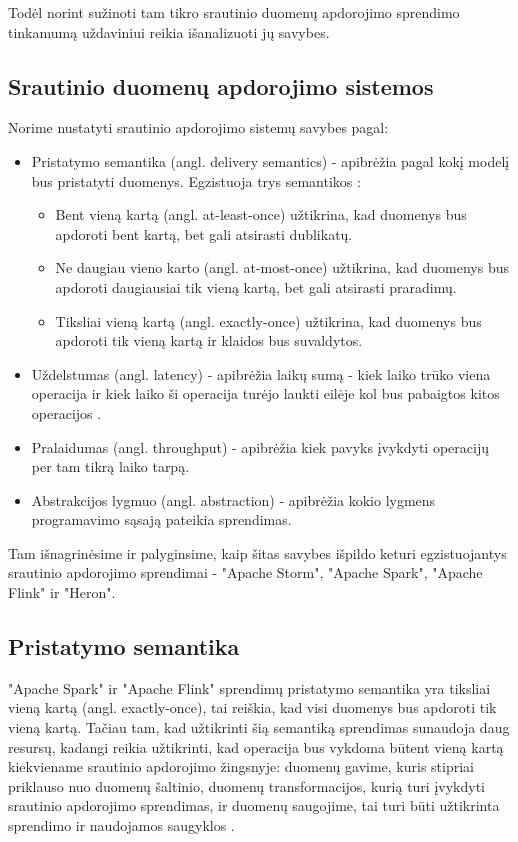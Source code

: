 \documentclass{VUMIFPSbakalaurinis}
\begin{document}
Todėl norint sužinoti tam tikro srautinio duomenų apdorojimo sprendimo tinkamumą uždaviniui reikia išanalizuoti jų savybes.   
\subsection{Srautinio duomenų apdorojimo sistemos}

Norime nustatyti srautinio apdorojimo sistemų savybes pagal:
\begin{itemize}
    \item Pristatymo semantika (angl. delivery semantics) - apibrėžia pagal kokį modelį bus pristatyti duomenys. Egzistuoja trys semantikos \cite{ensar20}: 
    \begin{itemize}
        \item Bent vieną kartą (angl. at-least-once) užtikrina, kad duomenys bus apdoroti bent kartą, bet gali atsirasti dublikatų. 
        \item Ne daugiau vieno karto (angl. at-most-once) užtikrina, kad duomenys bus apdoroti daugiausiai tik vieną kartą, bet gali atsirasti praradimų. 
        \item Tiksliai vieną kartą (angl. exactly-once) užtikrina, kad duomenys bus apdoroti tik vieną kartą ir klaidos bus suvaldytos.
    \end{itemize}
    \item Uždelstumas (angl. latency) - apibrėžia laikų sumą - kiek laiko trūko viena operacija ir kiek laiko ši operacija turėjo laukti eilėje kol bus pabaigtos kitos operacijos \cite{karimov2018benchmarking}.
    \item Pralaidumas (angl. throughput) - apibrėžia kiek pavyks įvykdyti operacijų per tam tikrą laiko tarpą.
    \item Abstrakcijos lygmuo (angl. abstraction) - apibrėžia kokio lygmens programavimo sąsają pateikia sprendimas.
\end{itemize}
Tam išnagrinėsime ir palyginsime, kaip šitas savybes išpildo keturi egzistuojantys srautinio apdorojimo sprendimai - "Apache Storm", "Apache Spark", "Apache Flink" ir "Heron".

\subsection{Pristatymo semantika}
"Apache Spark" ir "Apache Flink" sprendimų pristatymo semantika yra tiksliai vieną kartą (angl. exactly-once), tai reiškia, kad visi duomenys bus apdoroti tik vieną kartą. Tačiau tam, kad užtikrinti šią semantiką sprendimas sunaudoja daug resursų, kadangi reikia užtikrinti, kad operacija bus vykdoma būtent vieną kartą kiekviename srautinio apdorojimo žingsnyje: duomenų gavime, kuris stipriai priklauso nuo duomenų šaltinio, duomenų transformacijos, kurią turi įvykdyti srautinio apdorojimo sprendimas, ir duomenų saugojime, tai turi būti užtikrinta sprendimo ir naudojamos saugyklos \cite{zhang20}.\par
\end{document}

